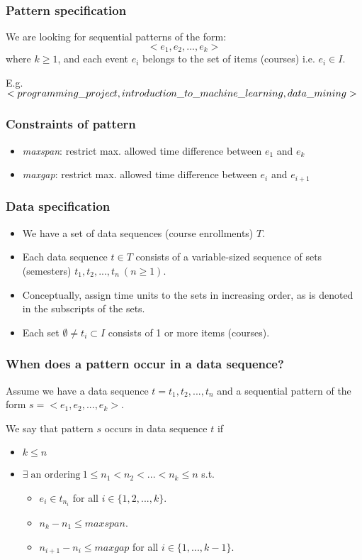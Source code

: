 \documentclass{beamer}
\begin{document}
\begin{frame}
  \frametitle{Pattern specification}
  We are looking for sequential patterns of the form:
  $$
    <e_1, e_2, ..., e_k>
  $$
  where $k \geq 1$, and each event $e_i$ belongs to the set of items (courses)
  i.e. $e_i \in I$.

  \quad

  E.g.
  $
  <programming\_project, introduction\_to\_machine\_learning, \linebreak data\_mining>
  $

\end{frame}

\begin{frame}
  \frametitle{Constraints of pattern}
  \begin{itemize}
    \item{\emph{maxspan}: restrict max. allowed time difference between $e_1$
    and $e_k$}
    \item{\emph{maxgap}: restrict max. allowed time difference between $e_i$
    and $e_{i+1}$}
  \end{itemize}
\end{frame}

\begin{frame}
  \frametitle{Data specification}
  \begin{itemize}
    \item{We have a set of data sequences (course enrollments) $T$.}
    \item{Each data sequence $t \in T$ consists of a variable-sized sequence of
    sets (semesters)  $t_1, t_2, ..., t_n \: (n \geq 1)$.}
    \item{Conceptually, assign time units to the sets in increasing order,
    as is denoted in the subscripts of the sets.}
    \item{Each set $\emptyset \neq t_i \subset I$ consists of 1 or more items
    (courses).}
  \end{itemize}
\end{frame}

\begin{frame}
  \frametitle{When does a pattern occur in a data sequence?}
  Assume we have a data sequence $t = t_1, t_2, ..., t_n$ and a sequential
  pattern of the form $s = <e_1, e_2, ..., e_k>$.

  \quad

  We say that pattern $s$ occurs in data sequence $t$ if
  \begin{itemize}
    \item{$k \leq n$}
    \item{$\exists \; \text{an ordering} \: 1 \leq n_1 < n_2 < ... <
    n_k \leq n$ s.t.
    \begin{itemize}
      \item{$e_i \in t_{n_i}$ for all $i \in \{1,2,...,k\}$.}
      \item{$n_k - n_1 \leq maxspan$.}
      \item{$n_{i+1} - n_i \leq maxgap$ for all $i \in \{1, ..., k-1\}$.}
    \end{itemize}
    }
  \end{itemize}
\end{frame}
\end{document}

